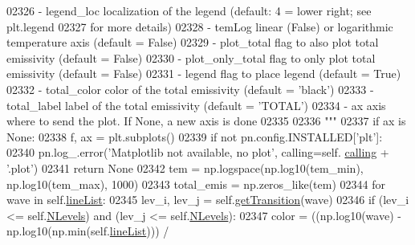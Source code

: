 \begin{DoxyCode}
{{{{{{{{{{{{{{{{{{{{{{02326 \textcolor{stringliteral}{            - legend\_loc      localization of the legend (default: 4 = lower right; see plt.legend }
02327 \textcolor{stringliteral}{                                for more details)}
02328 \textcolor{stringliteral}{            - temLog          linear (False) or logarithmic temperature axis (default = False)}
02329 \textcolor{stringliteral}{            - plot\_total      flag to also plot total emissivity (default = False)}
02330 \textcolor{stringliteral}{            - plot\_only\_total flag to only plot total emissivity (default = False)}
02331 \textcolor{stringliteral}{            - legend          flag to place legend (default = True)}
02332 \textcolor{stringliteral}{            - total\_color     color of the total emissivity (default = 'black')}
02333 \textcolor{stringliteral}{            - total\_label     label of the total emissivity (default = 'TOTAL')}
02334 \textcolor{stringliteral}{            - ax              axis where to send the plot. If None, a new axis is done}
02335 \textcolor{stringliteral}{}
02336 \textcolor{stringliteral}{        """}
02337         \textcolor{keywordflow}{if} ax \textcolor{keywordflow}{is} \textcolor{keywordtype}{None}:
02338             f, ax = plt.subplots()
02339         \textcolor{keywordflow}{if} \textcolor{keywordflow}{not} pn.config.INSTALLED[\textcolor{stringliteral}{'plt'}]: 
02340             pn.log\_.error(\textcolor{stringliteral}{'Matplotlib not available, no plot'}, calling=self.
      \hyperlink{classpyneb_1_1core_1_1pynebcore_1_1_atom_a373b7735acf4f528b54bddf373ad67a1}{calling} + \textcolor{stringliteral}{'.plot'})
02341             \textcolor{keywordflow}{return} \textcolor{keywordtype}{None}
02342         tem = np.logspace(np.log10(tem\_min), np.log10(tem\_max), 1000)
02343         total\_emis = np.zeros\_like(tem)
02344         \textcolor{keywordflow}{for} wave \textcolor{keywordflow}{in} self.\hyperlink{classpyneb_1_1core_1_1pynebcore_1_1_atom_a8280ef5632977a7cf7e8fe4c63127703}{lineList}:
02345             lev\_i, lev\_j = self.\hyperlink{classpyneb_1_1core_1_1pynebcore_1_1_atom_a7c9f17a3d9e841267add92377d9d1ede}{getTransition}(wave)
02346             \textcolor{keywordflow}{if} (lev\_i <= self.\hyperlink{classpyneb_1_1core_1_1pynebcore_1_1_atom_a6b43c1e6431a6786c1b4267f704fb4e8}{NLevels}) \textcolor{keywordflow}{and} (lev\_j <= self.\hyperlink{classpyneb_1_1core_1_1pynebcore_1_1_atom_a6b43c1e6431a6786c1b4267f704fb4e8}{NLevels}):
02347                 color = ((np.log10(wave) - np.log10(np.min(self.\hyperlink{classpyneb_1_1core_1_1pynebcore_1_1_atom_a8280ef5632977a7cf7e8fe4c63127703}{lineList}))) / 
}}}}}}}}}}}}}}}}}}}}}}
\end{DoxyCode}
